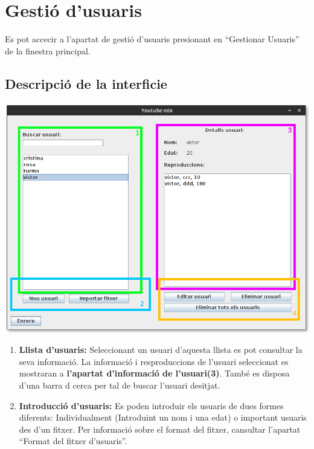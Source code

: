 \documentclass[letterpaper,10pt,oneside]{sphinxmanual}
\begin{document}
\chapter{Gestió d'usuaris}
\label{gest_usuaris::doc}\label{gest_usuaris:gestio-d-usuaris}
Es pot accecir a l'apartat de gestió d'usuaris presionant en ``Gestionar Usuaris'' de la finestra principal.


\section{Descripció de la interficie}
\label{gest_usuaris:descripcio-de-la-interficie}
\includegraphics{gest_usr.png}
\begin{enumerate}
\item {} 
\textbf{Llista d'usuaris:} Seleccionant un usuari d'aquesta llista es pot consultar la seva informació. La informació i resproduccions de l'usuari seleccionat es mostraran a \textbf{l'apartat d'informació de l'usuari(3)}. També es disposa d'una barra d cerca per tal de buscar l'usuari desitjat.

\item {} 
\textbf{Introducció d'usuaris:} Es poden introduir els usuaris de dues formes diferents: Individualment (Introduint un nom i una edat) o important usuaris des d'un fitxer. Per informació sobre el format del fitxer, cansultar l'apartat ``Format del fitxer d'usuaris''.

\end{enumerate}
\end{document}
